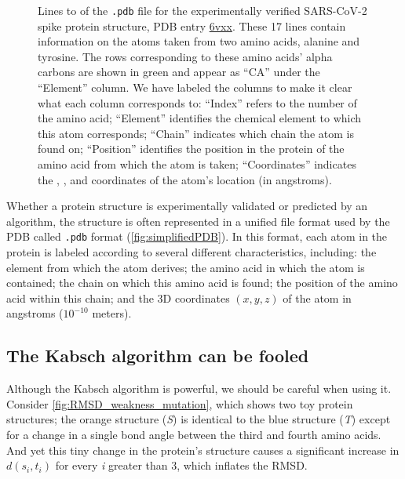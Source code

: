 \begin{figure}[h]
\caption{Lines  to  of the \texttt{.pdb} file for the experimentally verified SARS-CoV-2 spike protein structure, PDB entry \href{http://www.rcsb.org/structure/6VXX}{6vxx}. These 17 lines contain information on the atoms taken from two amino acids, alanine and tyrosine. The rows corresponding to these amino acids' alpha carbons are shown in green and appear as ``CA'' under the ``Element'' column.  We have labeled the columns to make it clear what each column corresponds to: ``Index'' refers to the number of the amino acid; ``Element'' identifies the chemical element to which this atom corresponds; ``Chain'' indicates which chain the atom is found on; ``Position'' identifies the position in the protein of the amino acid from which the atom is taken; ``Coordinates'' indicates the , , and  coordinates of the atom's location (in angstroms).}
\label{fig:simplifiedPDB}
\end{figure}

Whether a protein structure is experimentally validated or predicted by an algorithm, the structure is often represented in a unified file format used by the PDB called \texttt{.pdb} format (\autoref{fig:simplifiedPDB}). In this format, each atom in the protein is labeled according to several different characteristics, including: the element from which the atom derives; the amino acid in which the atom is contained; the chain on which this amino acid is found; the position of the amino acid within this chain; and the 3D coordinates $(x, y, z)$ of the atom in angstroms ($10^{-10}$ meters).\\

\begin{note}\end{note}

\subsection{The Kabsch algorithm can be fooled}

Although the Kabsch algorithm is powerful, we should be careful when using it. Consider \autoref{fig:RMSD_weakness_mutation}, which shows two toy protein structures; the orange structure (\textit{S}) is identical to the blue structure (\textit{T}) except for a change in a single bond angle between the third and fourth amino acids. And yet this tiny change in the protein's structure causes a significant increase in $d(s_{i}, t_{i})$ for every \textit{i} greater than 3, which inflates the RMSD.

